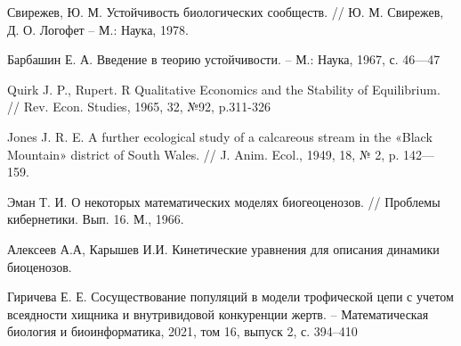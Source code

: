 \renewcommand{\refname}{\centering СПИСОК ЛИТЕРАТУРЫ}
\begin{thebibliography}{100}
    
        Свирежев, Ю. М. Устойчивость биологических сообществ. // Ю. М. Свирежев, Д. О. Логофет -- М.: Наука, 1978.

        Барбашин Е. А. Введение в теорию устойчивости. -- М.: Наука, 1967, с. 46—47

        Quirk J. P., Rupert. R Qualitative Economics and the Stability of Equilibrium. // Rev. Econ. Studies, 1965, 32, №92, p.311-326

        Jones J. R. E. A further ecological study of a calcareous stream in the «Black Mountain» district of South Wales. // J. Anim. Ecol., 1949, 18, № 2, p. 142—159.

        Эман Т. И. О некоторых математических моделях биогеоценозов. // Проблемы кибернетики. Вып. 16. М., 1966.

        Алексеев А.А, Карышев И.И. Кинетические уравнения для описания динамики биоценозов.
        
        Гиричева Е. Е. Сосуществование популяций в модели трофической цепи с учетом всеядности хищника и внутривидовой конкуренции жертв. -- Математическая биология и биоинформатика, 2021, том 16, выпуск 2, с. 394--410


\end{thebibliography}
